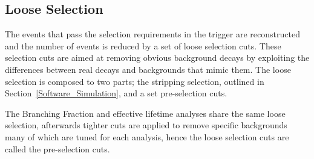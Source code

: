 \subsection{Loose Selection}
\label{sec:stripping}


The events that pass the selection requirements in the trigger are reconstructed and the number of events is reduced by a set of loose selection cuts. These selection cuts are aimed at removing obvious background decays by exploiting the differences between real \bmumu decays and backgrounds that mimic them. The loose selection is composed to two parts; the stripping selection, outlined in Section~\ref{Software_Simulation}, and a set pre-selection cuts. 


The Branching Fraction and effective lifetime analyses share the same loose selection, afterwards tighter cuts are applied to remove specific backgrounds many of which are tuned for each analysis, hence the loose selection cuts are called the pre-selection cuts. 


